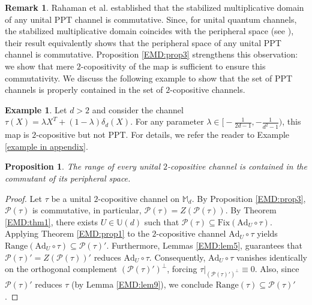 \documentclass[11pt,reqno]{amsart}
\theoremstyle{definition}
\newtheorem{eg}[defn]{Example}
\newtheorem{rmk}[defn]{Remark}
\theoremstyle{plain}
\newtheorem{prop}[defn]{Proposition}
\theoremstyle{remark}
\numberwithin{equation}{section}%
\begin{document}
\begin{rmk}
	Rahaman et al. \cite{RJP} established that the stabilized multiplicative domain of any unital PPT channel is commutative. Since, for unital quantum channels, the stabilized multiplicative domain coincides with the peripheral space (see \cite{BKT, MR}), their result equivalently shows that the peripheral space of any unital PPT channel is commutative. Proposition \ref{EMD:prop3} strengthens this observation: we show that mere \(2\)-copositivity of the map is sufficient to ensure this commutativity. 
	We discuss the following example to show that the set of PPT channels is properly contained in the set of $2$-copositive channels.
\end{rmk}





\begin{eg}\label{EMD:eg3}
	Let $d>2$ and consider the channel $\tau(X) = \lambda X^T + (1-\lambda)\delta_d(X)$. For any parameter $\lambda \in \big[ -\frac{1}{2d-1}, -\frac{1}{d^2-1} \big)$, this map is $2$-copositive but not PPT. For details, we refer the reader to Example \ref{example in appendix}.
\end{eg}



\begin{prop}\label{EMD:prop4}
	The range of every unital $2$-copositive channel is contained in the commutant of its peripheral space.
\end{prop}


\begin{proof}
	Let $\tau$ be a unital $2$-copositive channel on $\mathbb{M}_d$. By Proposition \ref{EMD:prop3}, $\mathcal{P}(\tau)$ is commutative, in particular,  $\mathcal{P}(\tau) = Z(\mathcal{P}(\tau))$. By Theorem \ref{EMD:thm1}, there exists $U \in \mathbb{U}(d)$ such that ${\mathcal{P}(\tau)}\subseteq\text{Fix}(\text{Ad}_U \circ \tau)$. Applying Theorem \ref{EMD:prop1} to the $2$-copositive channel $\text{Ad}_U \circ \tau$ yields $\text{Range}(\text{Ad}_U \circ \tau) \subseteq \mathcal{P}(\tau)'$. Furthermore, Lemmas \ref{EMD:lem5}, guarantees that $\mathcal{P}(\tau)'=Z(\mathcal{P}(\tau))'$ reduces $\text{Ad}_U \circ \tau$. Consequently, $\text{Ad}_U \circ \tau$ vanishes identically on the orthogonal complement $(\mathcal{P}(\tau)')^{\perp}$, forcing $\tau|_{(\mathcal{P}(\tau)')^{\perp}} \equiv 0$. Also, since $\mathcal{P}(\tau)'$ reduces $\tau$ (by Lemma \ref{EMD:lem9}), we conclude $\text{Range}(\tau) \subseteq \mathcal{P}(\tau)'$.
\end{proof}  
\end{document}
